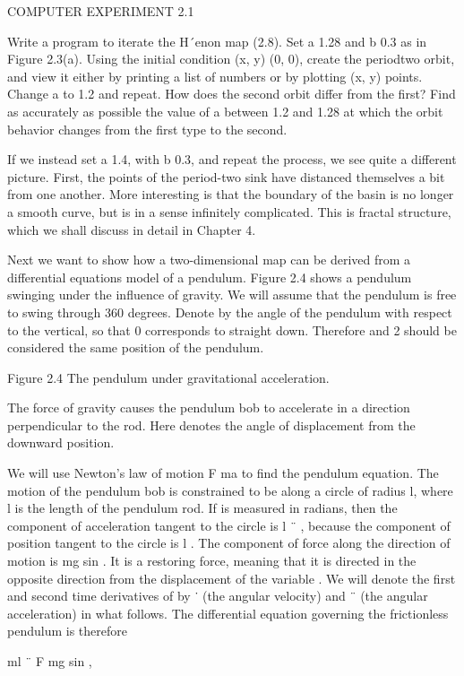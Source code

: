 \documentclass[12pt]{article}
\begin{document}
COMPUTER EXPERIMENT 2.1

Write a program to iterate the H´enon map (2.8). Set a  1.28 and b  0.3 as in Figure 2.3(a). Using the initial condition (x, y)  (0, 
0), create the periodtwo orbit, and view it either by printing a list of numbers or by plotting (x, y) points. Change a to 1.2 and 
repeat. How does the second orbit differ from the ﬁrst? Find as accurately as possible the value of a between 1.2 and 1.28 at which 
the orbit behavior changes from the ﬁrst type to the second.

If we instead set a  1.4, with b  0.3, and repeat the process, we see quite a different picture. First, the points of the period-two 
sink have distanced themselves a bit from one another. More interesting is that the boundary of the basin is no longer a smooth 
curve, but is in a sense inﬁnitely complicated. This is fractal structure, which we shall discuss in detail in Chapter 4.

Next we want to show how a two-dimensional map can be derived from a differential equations model of a pendulum. Figure 2.4 shows a 
pendulum swinging under the inﬂuence of gravity. We will assume that the pendulum is free to swing through 360 degrees. Denote by 
the angle of the pendulum with respect to the vertical, so that  0 corresponds to straight down. Therefore and  2  should be 
considered the same position of the pendulum.

Figure 2.4 The pendulum under gravitational acceleration.

The force of gravity causes the pendulum bob to accelerate in a direction perpendicular to the rod. Here denotes the angle of 
displacement from the downward position.

We will use Newton’s law of motion F  ma to ﬁnd the pendulum equation. The motion of the pendulum bob is constrained to be along a 
circle of radius l, where l is the length of the pendulum rod. If is measured in radians, then the component of acceleration tangent 
to the circle is l ¨ , because the component of position tangent to the circle is l . The component of force along the direction of 
motion is mg sin . It is a restoring force, meaning that it is directed in the opposite direction from the displacement of the 
variable . We will denote the ﬁrst and second time derivatives of by ˙ (the angular velocity) and ¨ (the angular acceleration) in 
what follows. The differential equation governing the frictionless pendulum is therefore

ml ¨  F  mg sin ,
\end{document}
